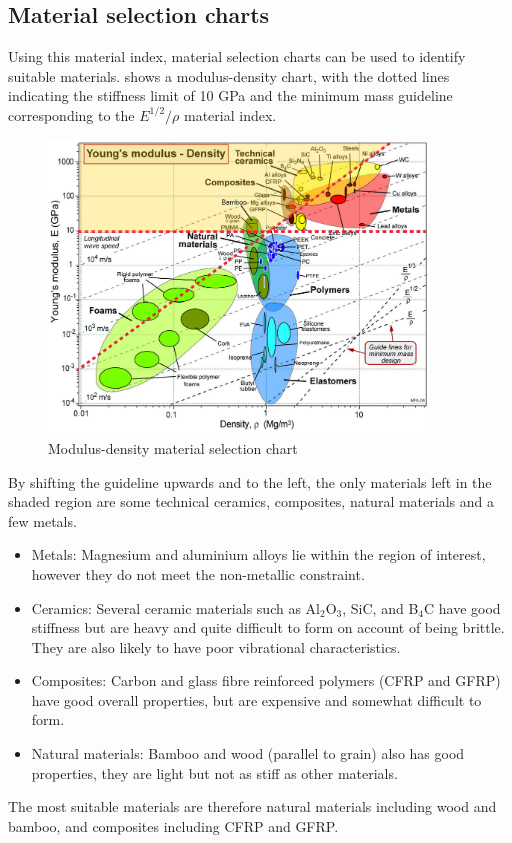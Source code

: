 \documentclass[main.tex]{subfiles}
\begin{document}
\begin{appendices}
\section{Material selection charts}
Using this material index, material selection charts can be used to identify suitable materials.  shows a modulus-density chart, with the dotted lines indicating the stiffness limit of 10 GPa and the minimum mass guideline corresponding to the $E^{1/2}/\rho$ material index. 
\begin{figure}[ht]
\includegraphics[width=0.9\textwidth]{8-Appendices/modulus.PNG}
\centering
\caption[Modulus-density material selection chart]{Modulus-density material selection chart \parencite{Ashby11}} 
\end{figure}

By shifting the guideline upwards and to the left, the only materials left in the shaded region are some technical ceramics, composites, natural materials and a few metals.
\begin{itemize}
\item Metals: Magnesium and aluminium alloys lie within the region of interest, however they do not meet the non-metallic constraint.
\item Ceramics:  Several ceramic materials such as Al$_2$O$_3$, SiC, and B$_4$C have good stiffness but are heavy and quite difficult to form on account of being brittle. They are also likely to have poor vibrational characteristics.
\item Composites: Carbon and glass fibre reinforced polymers (CFRP and GFRP) have good overall properties, but are expensive and somewhat difficult to form.
\item Natural materials: Bamboo and wood (parallel to grain) also has good properties, they are light but not as stiff as other materials.
\end{itemize}
The most suitable materials are therefore natural materials including wood and bamboo, and composites including CFRP and GFRP.


\end{appendices}
\end{document}
